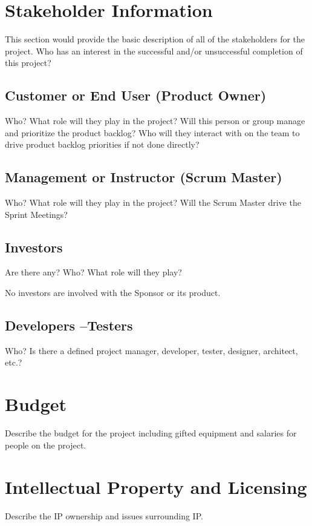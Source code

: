\section{ Stakeholder Information}


This section would provide the basic description of all of the stakeholders for 
the project. Who has an interest in the successful and/or unsuccessful completion of this project? 


\subsection{Customer or End User (Product Owner)}
Who?  What role will they play in the project?  Will this person or group manage 
and prioritize the product backlog?  Who will they interact with on the team to 
drive product backlog priorities if not done directly? 

\subsection{Management or Instructor (Scrum Master)}
Who?  What role will they play in the project?  Will the Scrum Master drive the 
Sprint Meetings? 


\subsection{Investors}
Are there any?  Who?  What role will they play? 

No investors are involved with the Sponsor or its product. 

\subsection{Developers --Testers}
Who?  Is there a defined project manager, developer, tester, designer, architect, 
etc.? 

\section{Budget}
Describe the budget for the project including gifted equipment and salaries for 
people on the project.

\section{Intellectual Property and Licensing}
Describe the IP ownership and issues surrounding IP.

